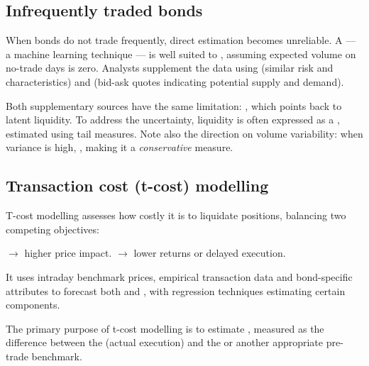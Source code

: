 \subsection{Infrequently traded bonds}

When bonds do not trade frequently, direct estimation becomes unreliable. A
 --- a machine learning technique --- is well suited
to ,
assuming expected volume on no-trade days is zero. Analysts supplement the data
using  (similar risk and characteristics) and  (bid-ask quotes indicating potential supply and demand).

\begin{imtrapbox}[breakable=false,title={Quoted liquidity is not executed liquidity}]
Both supplementary sources have the same limitation: , which points back to latent
liquidity. To address the uncertainty, liquidity is often expressed as a
, estimated using tail measures. Note also
the direction on volume variability: when variance is high, , making it a \emph{conservative} measure.
\end{imtrapbox}

\subsection{Transaction cost (t-cost) modelling}

T-cost modelling assesses how costly it is to liquidate positions, balancing two
competing objectives:

\begin{imkeybox}
 $\rightarrow$ higher price impact. \quad
{} $\rightarrow$ lower returns or delayed execution.
\end{imkeybox}

It uses intraday benchmark prices, empirical transaction data and bond-specific
attributes to forecast both  and ,
with regression techniques estimating certain components.

\begin{imdefbox}[title={Implementation shortfall}]
The primary purpose of t-cost modelling is to estimate ,
measured as the difference between the  (actual execution) and
the  or another appropriate pre-trade
benchmark.
\end{imdefbox}

